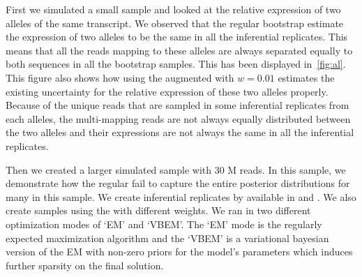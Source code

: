 First we simulated a small  sample and looked at the relative expression of two alleles of the
same transcript. We observed that the regular bootstrap estimate the expression of two alleles
to be the same in all the inferential replicates. This means that all the reads mapping to these alleles
are always separated equally to both sequences in all the bootstrap samples. This has been displayed
in~\cref{fig:al}. This figure also shows how using the augmented \boots with $w=0.01$ estimates the 
existing uncertainty for the relative expression of these two alleles properly. Because of the unique
reads that are sampled in some inferential replicates from each alleles, the multi-mapping reads
are not always equally distributed between the two alleles and their expressions are not always 
the same in all the inferential replicates.


Then we created a larger simulated sample with 30 M reads. In this sample,
we demonstrate how the regular \boots fail to capture the entire posterior distributions
for many \txps in this sample. We create inferential replicates by \boots available in \salmon and 
\kallisto. We also create \boot samples using the \aboots with different weights. We ran \salmon in two
different optimization modes of `EM' and `VBEM'. The `EM' mode is the regularly expected maximization 
algorithm and the `VBEM' is a variational bayesian version of the EM with non-zero priors for the 
model's parameters which induces further sparsity on the final solution.

